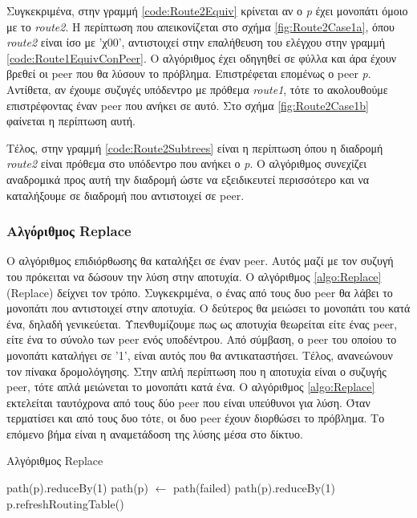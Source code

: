 Συγκεκριμένα, στην γραμμή \ref{code:Route2Equiv} κρίνεται αν ο \textit{p} 
έχει μονοπάτι όμοιο με το \textit{route2}. Η περίπτωση που απεικονίζεται στο 
σχήμα \ref{fig:Route2Case1a}, όπου \textit{route2} είναι ίσο με 'χ00', 
αντιστοιχεί στην επαλήθευση του ελέγχου στην γραμμή 
\ref{code:Route1EquivConPeer}. Ο αλγόριθμος έχει οδηγηθεί σε φύλλα και άρα 
έχουν βρεθεί οι peer που θα λύσουν το πρόβλημα. Επιστρέφεται επομένως ο peer 
\textit{p}. Αντίθετα, αν έχουμε συζυγές υπόδεντρο με πρόθεμα \textit{route1}, 
τότε το ακολουθούμε επιστρέφοντας έναν peer που ανήκει σε αυτό. Στο σχήμα 
\ref{fig:Route2Case1b} φαίνεται η περίπτωση αυτή.

Τέλος, στην γραμμή \ref{code:Route2Subtrees} είναι η περίπτωση όπου η 
διαδρομή \textit{route2} είναι πρόθεμα στο υπόδεντρο που ανήκει ο \textit{p}. 
Ο αλγόριθμος συνεχίζει αναδρομικά προς αυτή την διαδρομή ώστε να εξειδικευτεί 
περισσότερο και να καταλήξουμε σε διαδρομή που αντιστοιχεί σε peer.

\subsubsection{Αλγόριθμος Replace}
Ο αλγόριθμος επιδιόρθωσης θα καταλήξει σε έναν peer. Αυτός μαζί με τον 
συζυγή του πρόκειται να δώσουν την λύση στην αποτυχία. Ο αλγόριθμος 
\ref{algo:Replace} (Replace) δείχνει τον τρόπο. Συγκεκριμένα, ο ένας από 
τους δυο peer θα λάβει το μονοπάτι που αντιστοιχεί στην αποτυχία. Ο δεύτερος 
θα μειώσει το μονοπάτι του κατά ένα, δηλαδή γενικεύεται. Υπενθυμίζουμε πως 
ως αποτυχία θεωρείται είτε ένας peer, είτε ένα το σύνολο των peer ενός 
υποδέντρου. Από σύμβαση, ο peer του οποίου το μονοπάτι καταλήγει σε '1', 
είναι αυτός που θα αντικαταστήσει. Τέλος, ανανεώνουν τον πίνακα 
δρομολόγησης. Στην απλή περίπτωση που η αποτυχία 
είναι ο συζυγής peer, τότε απλά μειώνεται το μονοπάτι κατά ένα. 
Ο αλγόριθμος \ref{algo:Replace} εκτελείται ταυτόχρονα από τους δύο peer 
που είναι υπεύθυνοι για λύση. Όταν τερματίσει και από τους δυο τότε, οι 
δυο peer έχουν διορθώσει το πρόβλημα. Το επόμενο βήμα είναι η αναμετάδοση 
της λύσης μέσα στο δίκτυο.

\begin{algorithm}[H]
\caption{Αλγόριθμος Replace}
\label{algo:Replace}
\begin{algorithmic}[1]
            \State path(p).reduceBy(1)
        \Else
	            \State path(p) $\gets$ path(failed)
            \Else
                \State path(p).reduceBy(1)
            \EndIf
        \EndIf
        \State p.refreshRoutingTable()
    \EndProcedure
\end{algorithmic}
\end{algorithm}

